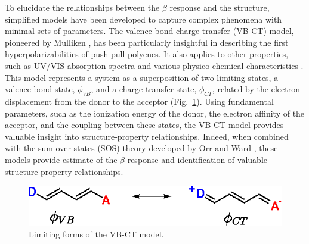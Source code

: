 \documentclass[USenglish]{article}
\begin{document}
To elucidate the relationships between the $\beta$ response and the structure, simplified models have been developed to capture complex phenomena with minimal sets of parameters. The valence-bond charge-transfer (VB-CT) model, pioneered by Mulliken \cite{mullikenMolecularCompoundsTheir1952}, has been particularly insightful in describing the first hyperpolarizabilities of push-pull polyenes. It also applies to other properties, such as UV/VIS absorption spectra and various physico-chemical characteristics \cite{benderTheoreticalModelsChargetransfer1986}. This model represents a system as a superposition of two limiting states, a valence-bond state, $\phi_{VB}$, and a charge-transfer state, $\phi_{CT}$, related by the electron displacement from the donor to the acceptor (Fig.~\ref{sc:vbct}). Using fundamental parameters, such as the ionization energy of the donor, the electron affinity of the acceptor, and the coupling between these states, the VB-CT model provides valuable insight into structure-property relationships.  Indeed, when combined with the sum-over-states (SOS) theory developed by Orr and Ward \cite{orrPerturbationTheoryNonlinear1971}, these models provide estimate of the $\beta$ response and identification of valuable structure-property relationships.


\begin{figure}[!h]
	\includegraphics[width=.5\linewidth]{Figure1}
	\caption{Limiting forms of the VB-CT model.}
	\label{sc:vbct}
\end{figure}
\end{document}
